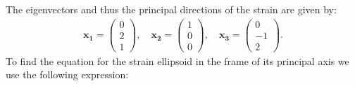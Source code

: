 \documentclass{article}
\begin{document}
The eigenvectors and thus the principal directions of the strain are given by:
\begin{align*}
    \mathbf{x_1} = \begin{pmatrix}
        0\\
        2\\
        1
    \end{pmatrix},\quad \mathbf{x_2} = \begin{pmatrix}
        1\\
        0\\
        0
    \end{pmatrix},\quad \mathbf{x_3} = \begin{pmatrix}
        0\\
        -1\\
        2
    \end{pmatrix}.
\end{align*}To find the equation for the strain ellipsoid in the frame of its principal axis we use the following expression:
\end{document}
